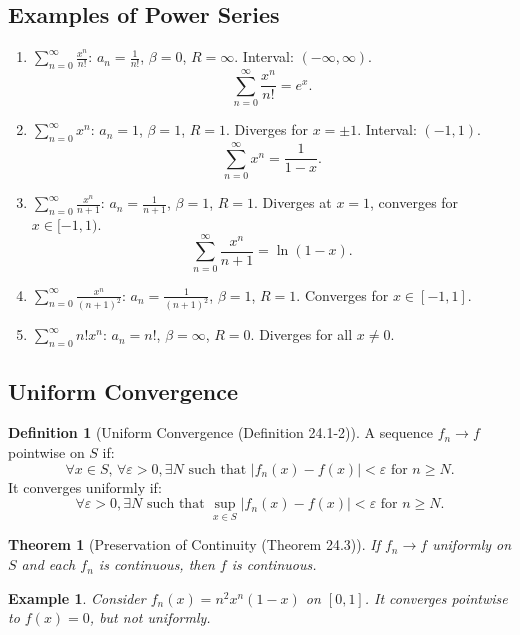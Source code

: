\documentclass[9pt]{article}
\theoremstyle{definition}
\newtheorem{definition}{Definition}
\theoremstyle{plain}
\newtheorem{theorem}{Theorem}
\newtheorem{example}{Example}
\begin{document}
\subsection*{Examples of Power Series}
\begin{enumerate}
    \item \( \sum_{n=0}^\infty \frac{x^n}{n!} \): \( a_n = \frac{1}{n!} \), \( \beta = 0 \), \( R = \infty \). Interval: \( (-\infty, \infty) \).
    \[
    \sum_{n=0}^\infty \frac{x^n}{n!} = e^x.
    \]
    \item \( \sum_{n=0}^\infty x^n \): \( a_n = 1 \), \( \beta = 1 \), \( R = 1 \). Diverges for \( x = \pm 1 \). Interval: \( (-1, 1) \).
    \[
    \sum_{n=0}^\infty x^n = \frac{1}{1-x}.
    \]
    \item \( \sum_{n=0}^\infty \frac{x^n}{n+1} \): \( a_n = \frac{1}{n+1} \), \( \beta = 1 \), \( R = 1 \). Diverges at \( x = 1 \), converges for \( x \in [-1, 1) \).
    \[
    \sum_{n=0}^\infty \frac{x^n}{n+1} = \ln(1-x).
    \]
    \item \( \sum_{n=0}^\infty \frac{x^n}{(n+1)^2} \): \( a_n = \frac{1}{(n+1)^2} \), \( \beta = 1 \), \( R = 1 \). Converges for \( x \in [-1, 1] \).
    \item \( \sum_{n=0}^\infty n! x^n \): \( a_n = n! \), \( \beta = \infty \), \( R = 0 \). Diverges for all \( x \neq 0 \).
\end{enumerate}

\subsection*{Uniform Convergence}
\begin{definition}[Uniform Convergence (Definition 24.1-2)]
A sequence \( f_n \to f \) pointwise on \( S \) if:
\[
\forall x \in S, \, \forall \varepsilon > 0, \exists N \text{ such that } |f_n(x) - f(x)| < \varepsilon \text{ for } n \geq N.
\]
It converges uniformly if:
\[
\forall \varepsilon > 0, \exists N \text{ such that } \sup_{x \in S} |f_n(x) - f(x)| < \varepsilon \text{ for } n \geq N.
\]
\end{definition}

\begin{theorem}[Preservation of Continuity (Theorem 24.3)]
If \( f_n \to f \) uniformly on \( S \) and each \( f_n \) is continuous, then \( f \) is continuous.
\end{theorem}

\begin{example}
Consider \( f_n(x) = n^2 x^n (1-x) \) on \( [0, 1] \). It converges pointwise to \( f(x) = 0 \), but not uniformly.
\end{example}
\end{document}
